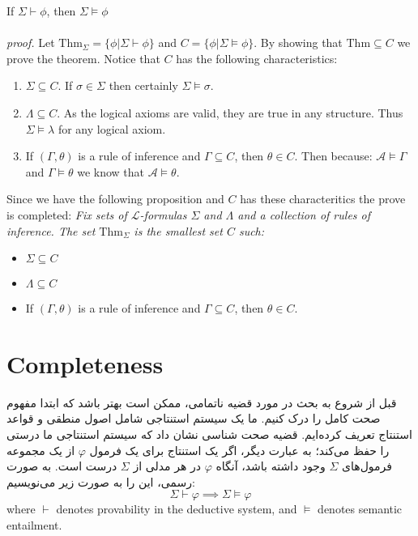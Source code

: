 \documentclass[10pt,a4paper]{article}
\newcounter{theo}
\newcommand{\curveL}{\mathcal{L}}
\newcommand{\curveA}{\mathcal{A}}
\newcommand{\thm}{\text{Thm}}
\begin{document}
                    \begin{theorem}
                        If $\Sigma\vdash\phi$, then $\Sigma\vDash\phi$
                        \\
                        \\
                        \textit{proof.} Let $\thm_\Sigma = \{\phi | \Sigma \vdash\phi\}$ and $C =\{\phi | \Sigma \vDash \phi\}$. By showing that $\thm\subseteq C$ we prove the theorem. Notice that $C$ has the following characteristics:
                        \begin{enumerate}
                            \item $\Sigma \subseteq C$. If $\sigma\in\Sigma$ then certainly $\Sigma\vDash\sigma$.
                            \item $\Lambda\subseteq C$. As the logical axioms are valid, they are true in any structure. Thus $\Sigma\vDash\lambda$ for any logical axiom.
                            \item If $(\Gamma,\theta)$ is a rule of inference and $\Gamma\subseteq C$, then $\theta\in C$. Then because: $\curveA\vDash\Gamma$ and $\Gamma\vDash\theta$ we know that $\curveA\vDash\theta$.
                        \end{enumerate}
                        Since we have the following proposition and $C$ has these characteritics the prove is completed:
                        \textit{Fix sets of $\curveL$-formulas $\Sigma$ and $\Lambda$ and a collection of rules of inference. The set $\thm_\Sigma$ is the smallest set $C$ such:}
                        \begin{itemize}
                            \item $\Sigma\subseteq C$
                            \item $\Lambda\subseteq C$ 
                            \item If $(\Gamma,\theta)$ is a rule of inference and $\Gamma\subseteq C$, then $\theta\in C$.
                        \end{itemize}
                    \end{theorem}
            \section{Completeness}
قبل از شروع به بحث در مورد قضیه ناتمامی، ممکن است بهتر باشد که ابتدا مفهوم صحت کامل را درک کنیم. ما یک سیستم استنتاجی شامل اصول منطقی و قواعد استنتاج تعریف کرده‌ایم. قضیه صحت شناسی نشان داد که سیستم استنتاجی ما درستی را حفظ می‌کند؛ به عبارت دیگر، اگر یک استنتاج برای یک فرمول $\varphi$ از یک مجموعه فرمول‌های $\Sigma$ وجود داشته باشد، آنگاه $\varphi$ در هر مدلی از $\Sigma$ درست است. به صورت رسمی، این را به صورت زیر می‌نویسیم:
                $$\Sigma \vdash \varphi \implies \Sigma \models \varphi$$
                where $\vdash$ denotes provability in the deductive system, and $\models$ denotes semantic entailment.
                
\end{document}

